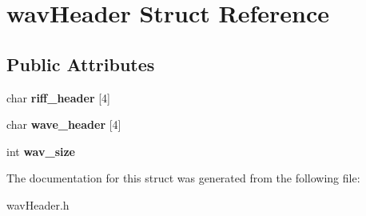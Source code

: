 \hypertarget{structwavHeader}{}\section{wav\+Header Struct Reference}
\label{structwavHeader}
\subsection*{Public Attributes}
\begin{DoxyCompactItemize}
\item 
\mbox{\label{structwavHeader_aa001e48dfa6193b32562533ad119c60d}} 
char {\bfseries riff\+\_\+header} \mbox{[}4\mbox{]}
\item 
\mbox{\label{structwavHeader_ae9a0bfdec6e8b7ba48dd27d7ac587f62}} 
char {\bfseries wave\+\_\+header} \mbox{[}4\mbox{]}
\item 
\mbox{\label{structwavHeader_adf513d299b6989b3046347077e077c82}} 
int {\bfseries wav\+\_\+size}
\end{DoxyCompactItemize}


The documentation for this struct was generated from the following file\+:\begin{DoxyCompactItemize}
\item 
wav\+Header.\+h\end{DoxyCompactItemize}
